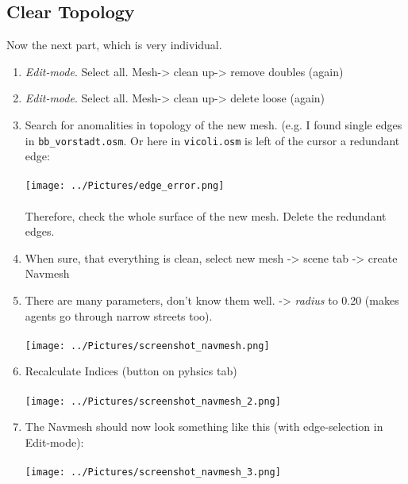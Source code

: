 \documentclass[10pt,a4paper]{article}
\begin{document}
\subsection{Clear Topology}
Now the next part, which is very individual. 
\begin{enumerate}
\item \textit{Edit-mode}. Select all. Mesh-> clean up-> remove doubles (again)
\item \textit{Edit-mode}. Select all. Mesh-> clean up-> delete loose (again)
\item Search for anomalities in topology of the new mesh. (e.g. I found single edges in \texttt{bb\_vorstadt.osm}.
Or here in \texttt{vicoli.osm} is left of the cursor a redundant edge:\\ \vspace{0.05cm}\\ 
\texttt{[image: ../Pictures/edge\_error.png]} \\ \vspace{0.05cm}\\
Therefore, check the whole surface of the new mesh. Delete the redundant edges.
\item When sure, that everything is clean, select new mesh -> scene tab -> create Navmesh
\item There are many parameters, don't know them well. -> \textit{radius} to 0.20 (makes agents go through narrow streets too). \\ \vspace{0.05cm}\\ 
\texttt{[image: ../Pictures/screenshot\_navmesh.png]} 
\item Recalculate Indices (button on pyhsics tab)\\ \vspace{0.05cm}\\ 
\texttt{[image: ../Pictures/screenshot\_navmesh\_2.png]}
\item The Navmesh should now look something like this (with edge-selection in Edit-mode):\\ \vspace{0.05cm}\\ 
\texttt{[image: ../Pictures/screenshot\_navmesh\_3.png]} 

\end{enumerate}
\end{document}
